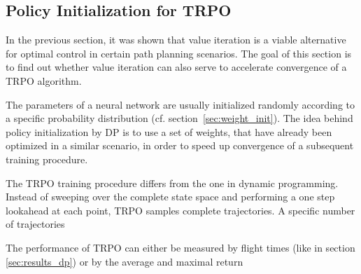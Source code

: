 \subsection{Policy Initialization for TRPO}
\label{sec:dp_init_trpo}
In the previous section, it was shown that value iteration is a viable alternative for optimal control in certain path planning scenarios. The goal of this section is to find out whether value iteration can also serve to accelerate convergence of a TRPO algorithm.

The parameters of a neural network are usually initialized randomly according to a specific probability distribution (cf. section~\ref{sec:weight_init}). The idea behind policy initialization by DP is to use a set of weights, that have already been optimized in a similar scenario, in order to speed up convergence of a subsequent training procedure.

The TRPO training procedure differs from the one in dynamic programming. Instead of sweeping over the complete state space and performing a one step lookahead at each point, TRPO samples complete trajectories. A specific number of trajectories 

The performance of TRPO can either be measured by flight times (like in section \ref{sec:results_dp}) or by the average and maximal return

